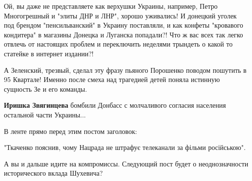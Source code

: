 \begin{itemize}
\begin{itemize}
 

Ой, вы даже не представляете как верхушки Украины, например, Петро Многогрешный
и "элиты ДНР и ЛНР", хорошо уживались! И донецкий уголек под брендом
"пенсильванский" в Украину поставляли, и как конфеты "кровавого кондитера" в
магазины Донецка и Луганска попадали?! Что ж вас всех так легко отвлечь от
настоящих проблем и переключить неделями трындеть о какой то статейке в
интернет издании?!


 

А Зеленский, трезвый, сделал эту фразу пьяного Порошенко поводом пошутить в 95
Квартале! Именно после смеха над трагедией детей поняла истинную сущность Зе и
его команды.


 
\textbf{Иришка Звягинцева} бомбили Донбасс с молчаливого согласия населения остальной части Украины...
\end{itemize}

 

В ленте прямо перед этим постом заголовок:

"Ткаченко пояснив, чому Нацрада не штрафує телеканали за фільми російською".

А вы и дальше идите на компромиссы. Следующий пост будет о неоднозначности
исторического вклада Шухевича? \Smiley[1.0][yellow]


 


\end{itemize}
